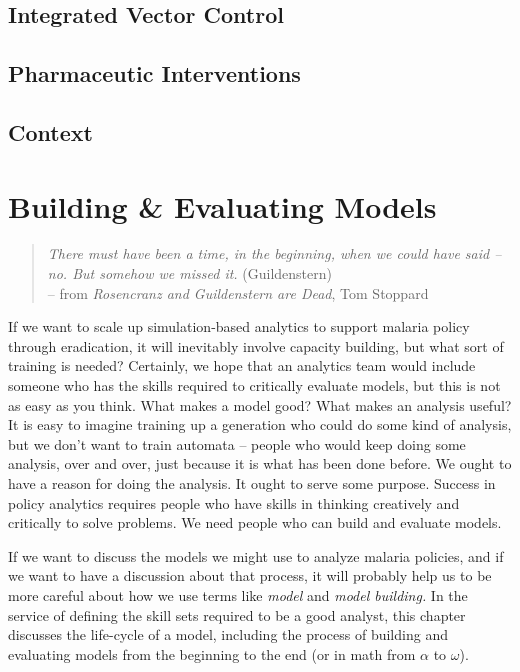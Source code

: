 \documentclass[
]{book}
\begin{document}
\hypertarget{integrated-vector-control}{%
\section{Integrated Vector Control}\label{integrated-vector-control}}

\hypertarget{pharmaceutic-interventions}{%
\section{Pharmaceutic Interventions}\label{pharmaceutic-interventions}}

\hypertarget{context}{%
\section{Context}\label{context}}

\hypertarget{building-evaluating-models}{%
\chapter{Building \& Evaluating Models}\label{building-evaluating-models}}

\begin{quote}
\emph{There must have been a time, in the beginning, when we could have said -- no. But somehow we missed it.} (Guildenstern)\\
-- from \emph{Rosencranz and Guildenstern are Dead}, Tom Stoppard
\end{quote}

If we want to scale up simulation-based analytics to support malaria policy through eradication, it will inevitably involve capacity building, but what sort of training is needed? Certainly, we hope that an analytics team would include someone who has the skills required to critically evaluate models, but this is not as easy as you think. What makes a model good? What makes an analysis useful? It is easy to imagine training up a generation who could do some kind of analysis, but we don't want to train automata -- people who would keep doing some analysis, over and over, just because it is what has been done before. We ought to have a reason for doing the analysis. It ought to serve some purpose. Success in policy analytics requires people who have skills in thinking creatively and critically to solve problems. We need people who can build and evaluate models.

If we want to discuss the models we might use to analyze malaria policies, and if we want to have a discussion about that process, it will probably help us to be more careful about how we use terms like \emph{model} and \emph{model building.} In the service of defining the skill sets required to be a good analyst, this chapter discusses the life-cycle of a model, including the process of building and evaluating models from the beginning to the end (or in math from \(\alpha\) to \(\omega\)).
\end{document}

